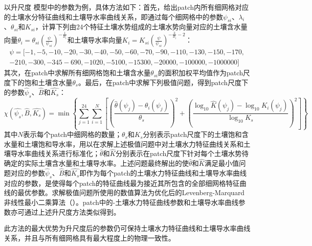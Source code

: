 以升尺度 \citet{campbell1974} 模型中的参数为例，具体方法如下：首先，给出patch内所有细网格对应的土壤水分特征曲线和土壤导水率曲线关系，即通过每个细网格中的参数$\psi_{si}$、$\lambda_{i}$、$\theta_{si}$和$K_{si}$，计算下列由24个特征土壤水势组成的土壤水势向量对应的土壤含水量向量$\theta_i=\theta_{si}\left(\frac{\psi}{\psi_{si}}\right)^{-\frac{1}{B_{i}}}$和土壤导水率向量$K_i=K_{si}\left(\frac{\psi}{\psi_{si}}\right)^{-\frac{3}{B_{i}}-2}$：
\begin{equation}
\begin{array}{l}\psi=[-1,-5,-10,-20,-30,-40,-50,-60,-70,-90,-110,-130,-150,-170,\\-210,-300,-345  -690,-1020,-5100,-15300,-20000,-100000,-1000000]\end{array}
\end{equation}
其次，在patch中求解所有细网格饱和土壤含水量$\theta_{si}$的面积加权平均值作为patch尺度下的饱和土壤含水量$\theta_s$。最后，在patch中求解下列极值问题，得到patch尺度下的参数$\hat{\psi}_{s}$、$\hat{B}$和$\hat{K_s}$：
\begin{equation}
\chi\left(\hat{\psi_s}, \hat{B}, \hat{K_s}\right)=\min\left\{ \sum_{j=1}^{24}\sum_{i=1}^{N}\left[\left(\frac{\hat{\theta}\left(\psi_j\right)-\theta_i\left(\psi_j\right)}{\theta_s}\right)^2
+\left(\frac{\log_{10}\hat{K}\left(\psi_j\right)-\log_{10}K_i\left(\psi_j\right)}{\log_{10}K_s}\right)^2\right]\right\}
\end{equation}
其中$N$表示每个patch中细网格的数量；$\theta_s$和$K_s$分别表示patch尺度下的土壤饱和含水量和土壤饱和导水率，用以在求解上述极值问题中对土壤水力特征曲线关系和土壤导水率曲线关系进行标准化；$\hat{\theta}$和$\hat{K}$分别表示在patch尺度下针对每个土壤水势待确定的实际土壤含水量和土壤导水率。上述问题最终解出的使$\hat{\theta}$和$\hat{K}$满足最小值问题对应的参数$\hat{\psi}_{s}$、$\hat{B}$和$\hat{K_s}$即作为每个patch的土壤水力特征曲线和土壤导水率曲线对应的参数，是使得每个patch的特征曲线最为接近其所包含的全部细网格特征曲线的最优参数。求解极值问题所使用的数值算法为优化后的Levenberg-Marquard非线性最小二乘算法（\citet{Montzka2017scale}）。patch中的\citet{van1980closed}-\citet{mualem1976new}土壤水力特征曲线参数和土壤导水率曲线参数亦可通过上述升尺度方法类似得到。

此方法的最大优势为升尺度后的参数仍可保持土壤水力特征曲线和土壤导水率曲线关系，并且与所有细网格具有最大程度上的物理一致性。